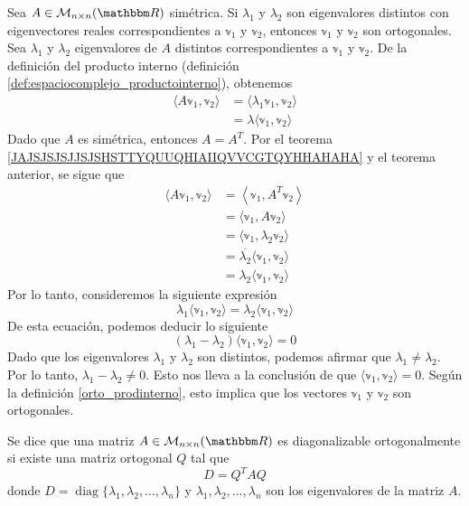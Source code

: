 \begin{theorem}\label{theorem_simetrica2}
    Sea $A \in \mathcal{M}_{n \times n}(\RR)$ simétrica. Si $\lambda_1$ y $\lambda_2$ son eigenvalores distintos con eigenvectores reales correspondientes a $\mathbb{v}_1$ y $\mathbb{v}_2$, entonces $\mathbb{v}_1$ y $\mathbb{v}_2$ son ortogonales. \\
    \demostracion Sea $\lambda_1$ y $\lambda_2$ eigenvalores de $A$ distintos correspondientes a $\mathbb{v}_1$ y $\mathbb{v}_2$. De la definición del producto interno (definición \ref{def:espaciocomplejo_productointerno}), obtenemos
    \begin{align*}
        \langle A\mathbb{v}_1, \mathbb{v}_2 \rangle & = \langle \lambda_1 \mathbb{v}_1, \mathbb{v}_2 \rangle \\
        & = \lambda \langle \mathbb{v}_1, \mathbb{v}_2 \rangle
    \end{align*}
    Dado que $A$ es simétrica, entonces $A = A^T$. Por el teorema \ref{JAJSJSJSJJSJSHSTTYQUUQHIAIIQVVCGTQYHHAHAHA} y el teorema anterior, se sigue que
    \begin{align*}
        \langle A\mathbb{v}_1, \mathbb{v}_2 \rangle & = \left\langle \mathbb{v}_1, A^T \mathbb{v}_2 \right\rangle \\
        & = \langle \mathbb{v}_1, A\mathbb{v}_2 \rangle \\
        & = \langle \mathbb{v}_1, \lambda_2 \mathbb{v}_2 \rangle \\
        & = \overline{\lambda_2} \langle \mathbb{v}_1, \mathbb{v}_2 \rangle \\
        & = \lambda_2 \langle \mathbb{v}_1, \mathbb{v}_2 \rangle
    \end{align*}
    Por lo tanto, consideremos la siguiente expresión
    $$\lambda_1 \langle \mathbb{v}_1, \mathbb{v}_2 \rangle = \lambda_2 \langle \mathbb{v}_1, \mathbb{v}_2 \rangle$$
    De esta ecuación, podemos deducir lo siguiente
    $$(\lambda_1 - \lambda_2) \langle \mathbb{v}_1, \mathbb{v}_2 \rangle = 0$$
    Dado que los eigenvalores $\lambda_1$ y $\lambda_2$ son distintos, podemos afirmar que $\lambda_1 \neq \lambda_2$. Por lo tanto, $\lambda_1 - \lambda_2 \neq 0$. Esto nos lleva a la conclusión de que $\langle \mathbb{v}_1, \mathbb{v}_2 \rangle = 0$. Según la definición \ref{orto_prodinterno}, esto implica que los vectores $\mathbb{v}_1$ y $\mathbb{v}_2$ son ortogonales.
\end{theorem}

\newpage

\begin{definition}
    Se dice que una matriz $A \in \mathcal{M}_{n \times n}(\RR)$ es diagonalizable ortogonalmente si existe una matriz ortogonal $Q$ tal que
    $$D = Q^{T}AQ$$
    donde $D = \operatorname{diag} \{ \lambda_1, \lambda_2, \dots, \lambda_n \}$ y $\lambda_1, \lambda_2, \dots, \lambda_n$ son los eigenvalores de la matriz $A$.
\end{definition}

